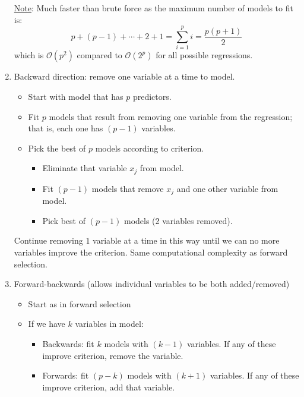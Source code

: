 \begin{enumerate}[label=(\roman*)]
          \underline{Note}: Much faster than brute force as the
          maximum number of models to fit is:
          \[ p+(p-1)+\cdots+2+1=\sum_{i=1}^{p}i=\frac{p(p+1)}{2} \]
          which is $ \mathcal{O}(p^2) $ compared to $ \mathcal{O}(2^p) $
          for all possible regressions.
    \item Backward direction: remove one variable at a time to model.
          \begin{itemize}
              \item Start with model that has $ p $ predictors.
              \item Fit $ p $ models that result from removing one variable
                    from the regression; that is, each one has $ (p-1) $
                    variables.
              \item Pick the best of $ p $ models according to criterion.
                    \begin{itemize}
                        \item Eliminate that variable $ x_j $ from model.
                        \item Fit $ (p-1) $ models that remove $ x_j $
                              and one other variable from model.
                        \item Pick best of $ (p-1) $ models
                              (2 variables removed).
                    \end{itemize}
          \end{itemize}
          Continue removing $ 1 $ variable at a time in this way until
          we can no more variables improve the criterion. Same computational
          complexity as forward selection.
    \item Forward-backwards (allows individual variables to be both added/removed)
          \begin{itemize}
              \item Start as in forward selection
              \item If we have $ k $ variables in model:
                    \begin{itemize}
                        \item Backwards: fit $ k $ models with $ (k-1) $
                              variables. If any of these improve criterion,
                              remove the variable.
                        \item Forwards: fit $ (p-k) $ models with $ (k+1) $
                              variables. If any of these improve criterion,
                              add that variable.
                    \end{itemize}
          \end{itemize}
\end{enumerate}
